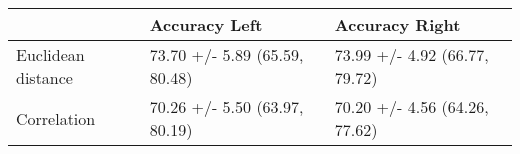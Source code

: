 \begin{tabular}{lll}
\toprule
{} &                  Accuracy Left &                 Accuracy Right \\
\midrule
Euclidean distance &  73.70 +/- 5.89 (65.59, 80.48) &  73.99 +/- 4.92 (66.77, 79.72) \\
Correlation        &  70.26 +/- 5.50 (63.97, 80.19) &  70.20 +/- 4.56 (64.26, 77.62) \\
\bottomrule
\end{tabular}
